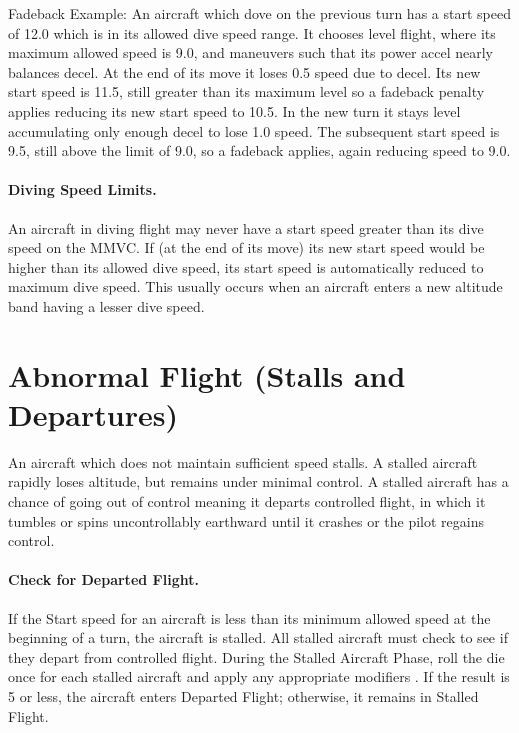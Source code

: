 Fadeback Example: An aircraft which dove on the previous turn has a start speed of 12.0 which is in its allowed dive speed range. It chooses level flight, where its maximum allowed speed is 9.0, and maneuvers such that its power accel nearly balances decel. At the end of its move it loses 0.5 speed due to decel. Its new start speed is 11.5, still greater than its maximum level so a fadeback penalty applies reducing its new start speed to 10.5. In the new turn it stays level accumulating only enough decel to lose 1.0 speed. The subsequent start speed is 9.5, still above the limit of 9.0, so a fadeback applies, again reducing speed to 9.0.

\paragraph{Diving Speed Limits.} An aircraft in diving flight may never have a start speed greater than its dive speed on the MMVC. If (at the end of its move) its new start speed would be higher than its allowed dive speed, its start speed is automatically reduced to maximum dive speed. This usually occurs when an aircraft enters a new altitude band having a lesser dive speed. 


\section{Abnormal Flight (Stalls and Departures)}
\label{rule:abnormal-flight}

An aircraft which does not maintain sufficient speed stalls. A stalled aircraft rapidly loses altitude, but remains under minimal control. A stalled aircraft has a chance of going out of control meaning it departs controlled flight, in which it tumbles or spins uncontrollably earthward until it crashes or the pilot regains control.




\paragraph{Check for Departed Flight.} 
If the Start speed for an aircraft is less than its minimum allowed speed at the beginning of a turn, the aircraft is stalled. All stalled aircraft must check to see if they depart from controlled flight. During the Stalled Aircraft Phase, roll the die once for each stalled aircraft and apply any appropriate modifiers . If the result is 5 or less, the aircraft enters Departed Flight; otherwise, it remains in Stalled Flight.

